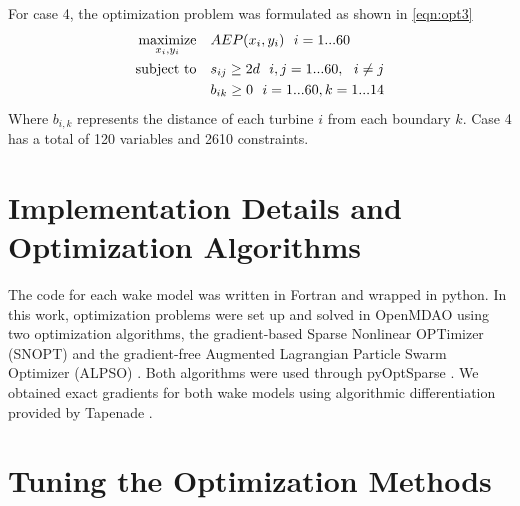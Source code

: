 \documentclass{jpconf}
\begin{document}
%
For case 4, the optimization problem was formulated as shown in \cref{eqn:opt3}
%
\begin{equation}
\label{eqn:opt3}
\begin{aligned} [b]
\underset{x_i,y_i}{\textrm{maximize}} \quad & AEP(x_i,y_i)~~i=1...60\\
\textrm{subject to} \quad & s_{ij} \geq 2\*d~~i,j=1...60,~~i \neq j\\
& b_{ik} \geq 0 ~~ i=1...60, k=1...14
\end{aligned}
\end{equation}
%
Where $b_{i,k}$ represents the distance of each turbine $i$ from each boundary $k$. Case 4 has a total of 120 variables and 2610 constraints.

\section{Implementation Details and Optimization Algorithms}\label{sec:computation}
The code for each wake model was written in Fortran and wrapped in python. In this work, optimization problems were set up and solved in OpenMDAO \cite{gray2010_OpenMDAO} using two optimization algorithms, the gradient-based Sparse Nonlinear OPTimizer (SNOPT)  \cite{gill2005} and the gradient-free Augmented Lagrangian Particle Swarm Optimizer (ALPSO) \cite{jansen2011_alpso}. Both algorithms were used through pyOptSparse \cite{perez2012a}. We obtained exact gradients for both wake models using algorithmic differentiation provided by Tapenade \cite{tapenade2013}.

\section{Tuning the Optimization Methods}\label{sec:tuning}
\end{document}
